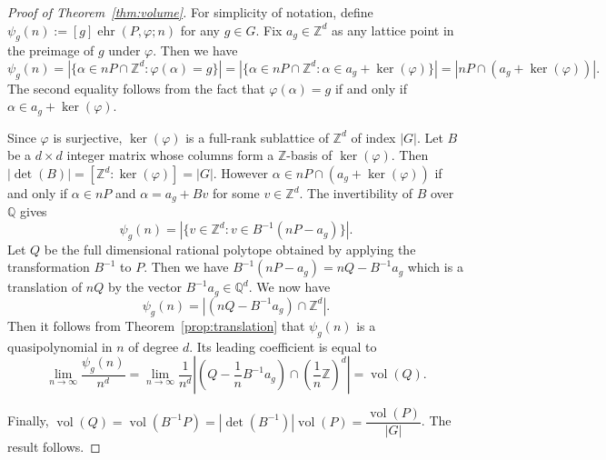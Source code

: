 \documentclass[10pt,a4paper]{amsart}
\DeclareMathOperator{\ehr}{ehr}
\DeclareMathOperator{\vol}{vol}
\newcommand{\Q}{\mathbb{Q}}
\newcommand{\Z}{\mathbb{Z}}
\renewcommand{\phi}{\varphi}
\begin{document}
\begin{proof}[Proof of Theorem~\ref{thm:volume}]
For simplicity of notation, define $\psi_g(n):=[g]\ehr(P,\phi;n)$ for any $g \in G$.  Fix $a_g \in \Z^d$ as any lattice point in the preimage of $g$ under $\phi$. Then we have
\[
\psi_g(n) =|\{\alpha \in nP \cap \Z^d \colon \phi(\alpha)=g\}|= |\{\alpha \in nP \cap \mathbb{Z}^d \colon \alpha \in a_g + \ker(\varphi)\}| = |nP \cap (a_g+\ker(\varphi))|.
\]
The second equality follows from the fact that $\phi(\alpha)=g$ if and only if $\alpha \in a_g+\ker(\varphi)$.

Since $\phi$ is surjective, $\ker(\phi)$ is a full-rank sublattice of $\Z^d$ of index $|G|$. Let $B$ be a $d \times d$ integer matrix whose columns form a $\Z$-basis of $\ker(\phi)$. Then $|\det(B)|=[\Z^d:\ker(\phi)]=|G|$. 
However $\alpha \in nP \cap (a_g+\ker(\phi))$ if and only if $\alpha \in nP$ and $\alpha=a_g+Bv$ for some $v \in \Z^d$. 
The invertibility of $B$ over $\Q$  gives 
\[
\psi_g(n) = |\{v \in \Z^d \colon v \in B^{-1}(nP-a_g)\}|.
\]
Let $Q$ be the full dimensional rational polytope obtained by applying the transformation $B^{-1}$ to $P$. Then we have $B^{-1}(nP-a_g)=nQ-B^{-1}a_g$ which is a translation of $nQ$ by the vector $B^{-1}a_g \in \mathbb{Q}^d$. We now have
\[
\psi_g(n)=|(nQ-B^{-1}a_g) \cap \mathbb{Z}^d|.
\]
Then it follows from Theorem~\ref{prop:translation} that $\psi_g(n)$ is a quasipolynomial in $n$ of degree $d$. Its leading coefficient is equal to 
\[
\lim_{n\rightarrow \infty} \frac{\psi_g(n)}{n^d} = \lim_{n\rightarrow \infty} \frac{1}{n^d} \left| \left(Q-\frac{1}{n}B^{-1}a_g\right) \cap \left(\frac{1}{n}\Z\right)^d\right| = \vol(Q).
\]



Finally, $\vol(Q)=\vol(B^{-1}P)=|\det(B^{-1})|\vol(P)=\dfrac{\vol(P)}{|G|}$. The result follows.
\end{proof}
\end{document}
